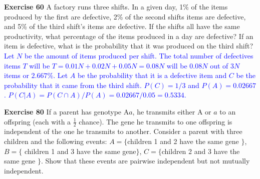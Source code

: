 \documentclass[10pt,a4paper]{report}
\newcommand{\BLUE}[1]{\textcolor{blue}{#1}}
\begin{document}
\noindent\textbf{Exercise 60} A factory runs three shifts.  In a given day, 1\% of the items produced by the first are defective, 2\% of the second shifts items are defective, and 5\% of the third shift's items are defective.  If the shifts all have the same productivity, what percentage of the items produced in a day are defective?  If an item is defective, what is the probability that it was produced on the third shift?\\

\BLUE{Let $N$ be the amount of items produced per shift.  The total number of defectives items $T$ will be $T = 0.01N+0.02N+0.05N = 0.08N$ will be $0.08N$ out of $3N$ items or $2.667\%$.  Let $A$ be the probability that it is a defective item and $C$ be the probability that it came from the third shift.  $P(C) = 1/3$ and $P(A) = 0.02667$.  $P(C|A) = P(C \cap A)/P(A) = 0.02667/0.05 = 0.5334$.\\
}

\noindent\textbf{Exercise 80}  If a parent has genotype A$a$, he transmits either A or $a$ to an offspring (each with a $\frac{1}{2}$ chance).  The gene he transmits to one offspring is independent of the one he transmits to another.  Consider a parent with three children and the following events:  $A = \{$children 1 and 2 have the same gene $\}$, $B=\{$ children 1 and 3 have the same gene$\}$, $C=\{$children 2 and 3 have the same gene $\}$.  Show that these events are pairwise independent but not mutually independent.
\end{document}
